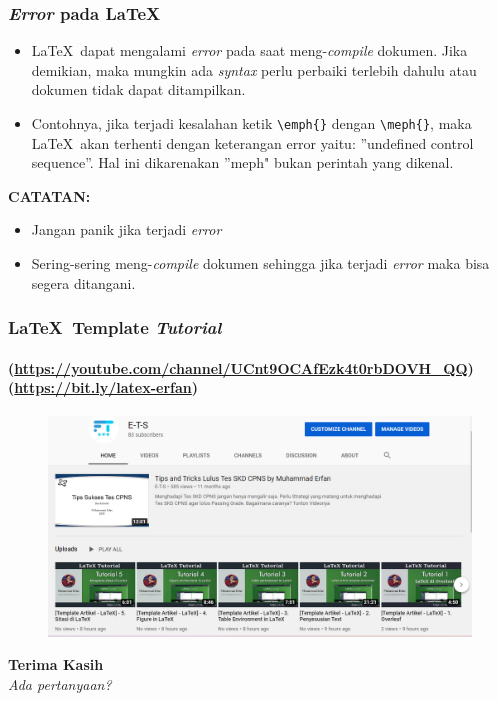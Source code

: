 \documentclass[aspectratio=169]{beamer}
\begin{document}
\begin{frame}[fragile]
\frametitle{\textit{Error} pada \LaTeX}
\begin{itemize}
    \item \LaTeX\ dapat mengalami \textit{error} pada saat meng-\textit{compile} dokumen. Jika demikian, maka mungkin ada \textit{syntax} perlu perbaiki terlebih dahulu atau dokumen tidak dapat ditampilkan.
    \item Contohnya, jika terjadi kesalahan ketik \verb|\emph{}| dengan \verb|\meph{}|, maka \LaTeX\ akan terhenti dengan keterangan error yaitu: ''undefined control sequence''. Hal ini dikarenakan ''meph" bukan perintah yang dikenal.
\end{itemize}
\textbf{CATATAN:}
\begin{itemize}
    \item Jangan panik jika terjadi \textit{error}
    \item Sering-sering meng-\textit{compile} dokumen sehingga jika terjadi \textit{error} maka bisa segera ditangani.
\end{itemize}
\end{frame}

\begin{frame}
\frametitle{\LaTeX\ Template \textit{Tutorial}}
\framesubtitle{(\url{https://youtube.com/channel/UCnt9OCAfEzk4t0rbDOVH_QQ})\\(\url{https://bit.ly/latex-erfan})}
\begin{figure}
    \centering
    \includegraphics[width=\textwidth]{gambar/Youtube.png}
\end{figure}
\end{frame}

\begin{frame}
\centering
\textbf{\Huge Terima Kasih}\\ \textit{Ada pertanyaan?}
\end{frame}
\end{document}
